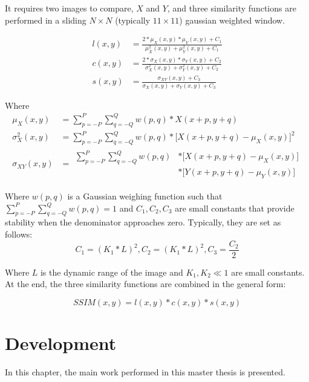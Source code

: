 \documentclass{cslthse-msc}
\begin{document}
It requires two images to compare, $X$ and $Y$, and three similarity functions are performed in a sliding $N\times N$ (typically $11\times 11$) gaussian weighted window.

\begin{equation}\label{eq:ssim_components}
\begin{split}
l(x,y) & = \frac{2*\mu_X(x,y)*\mu_Y(x,y)+C_1}{\mu_X^2(x,y)+\mu_Y^2(x,y)+C_1} \\ 
c(x,y) & = \frac{2*\sigma_X(x,y)*\sigma_Y(x,y)+C_2}{\sigma_X^2(x,y)+\sigma_Y^2(x,y)+C_2} \\ 
s(x,y) & = \frac{\sigma_{XY}(x,y)+C_3}{\sigma_X(x,y)+\sigma_Y(x,y)+C_3}
\end{split}
\end{equation}

Where
\begin{equation*}
\begin{split}
\mu_X(x,y) & = \sum\limits_{p=-P}^{P} \sum\limits_{q=-Q}^{Q} w(p,q)*X(x+p,y+q)\\ 
\sigma_X^2(x,y) & = \sum\limits_{p=-P}^{P} \sum\limits_{q=-Q}^{Q} w(p,q)*\lbrack X(x+p,y+q)-\mu_X(x,y) \rbrack^2\\ 
\sigma_{XY}(x,y) & = \begin{split}\sum\limits_{p=-P}^{P} \sum\limits_{q=-Q}^{Q} w(p,q)& *\lbrack X(x+p,y+q)-\mu_X(x,y)\rbrack \\ & *\lbrack Y(x+p,y+q)-\mu_Y(x,y)\rbrack\end{split}
\end{split}
\end{equation*}

Where $w(p,q)$ is a Gaussian weighing function such that $\sum\limits_{p=-P}^{P} \sum\limits_{q=-Q}^{Q} w(p,q)=1$ and $C_1,C_2,C_3$ are small constants that provide stability when the denominator approaches zero. Typically, they are set as follows: 
\begin{equation*}
	C_1=(K_1*L)^2,C_2=(K_1*L)^2,C_3=\frac{C_2}{2}
\end{equation*}

Where $L$ is the dynamic range of the image and $K_1,K_2\ll1$ are small constants. At the end, the three similarity functions are combined in the general form: 

\begin{equation}\label{eq:ssim}
SSIM(x,y)=l(x,y)*c(x,y)*s(x,y)
\end{equation}



\chapter{Development}
In this chapter, the main work performed in this master thesis is presented.
\end{document}
